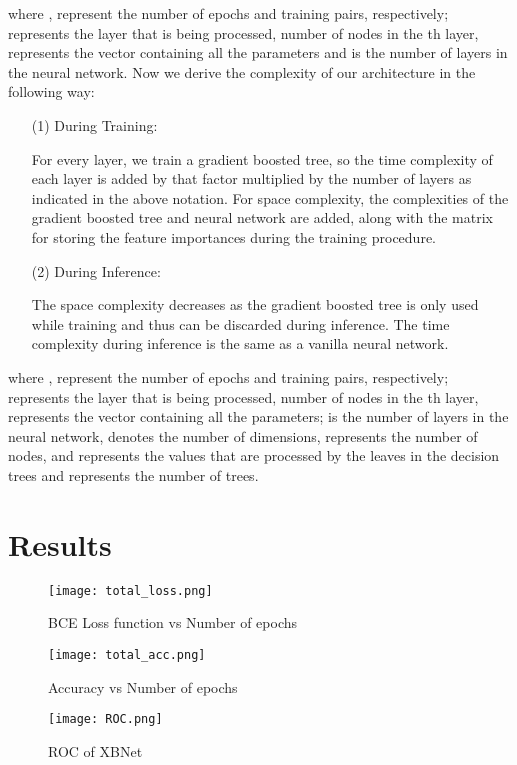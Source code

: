 \documentclass[review]{elsarticle}
\begin{document}
  where ,  represent the number of epochs and training pairs, respectively;  represents the layer that is being processed,  number of nodes in the th layer,  represents the vector containing all the parameters and  is the number of layers in the neural network.
  Now we derive the complexity of our architecture in the following way:
  \begin{enumerate}
      \item[(1)] During Training:
      
      For every layer, we train a gradient boosted tree, so the time complexity of each layer is added by that factor multiplied by the number of layers as indicated in the above notation. For space complexity, the complexities of the gradient boosted tree and neural network are added, along with the matrix for storing the feature importances during the training procedure.
        \item[(2)] During Inference:
        
      The space complexity decreases as the gradient boosted tree is only used while training and thus can be discarded during inference. The time complexity during inference is the same as a vanilla neural network.
  \end{enumerate}
  where ,  represent the number of epochs and training pairs, respectively;  represents the layer that is being processed,  number of nodes in the th layer,  represents the vector containing all the parameters;  is the number of layers in the neural network,  denotes the number of dimensions,  represents the number of nodes, and  represents the values that are processed by the leaves in the decision trees and  represents the number of trees.
 

\section{Results}
\begin{figure*}[bt!]
\centerline{\texttt{[image: total\_loss.png]}}
\caption{BCE Loss function vs Number of epochs}    
  \label{fig:loss}
\end{figure*}

\begin{figure*}[ht!]
\centerline{\texttt{[image: total\_acc.png]}}
\caption{Accuracy vs Number of epochs}    
  \label{fig:acc}
\end{figure*}

\begin{figure*}[ht!]
\centerline{\texttt{[image: ROC.png]}}
\caption{ROC of XBNet}    
  \label{fig:acc}
\end{figure*}
\end{document}
